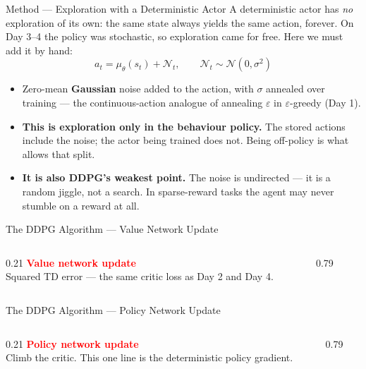 \begin{frame}{Method --- Exploration with a Deterministic Actor}
\vspace{0.4em}
A deterministic actor has \emph{no} exploration of its own: the same state always yields the same action, forever. On Day 3--4 the policy was stochastic, so exploration came for free. Here we must add it by hand:
\[
a_t = \mu_\theta(s_t) + \mathcal{N}_t, \qquad \mathcal{N}_t \sim \mathcal{N}(0, \sigma^2)
\]
\begin{itemize}
    \item Zero-mean \textbf{Gaussian} noise added to the action, with $\sigma$ annealed over training --- the continuous-action analogue of annealing $\varepsilon$ in $\varepsilon$-greedy (Day 1).
    \pause
    \item \textbf{This is exploration only in the behaviour policy.} The stored actions include the noise; the actor being trained does not. Being off-policy is what allows that split.
    \item \textbf{It is also DDPG's weakest point.} The noise is undirected --- it is a random jiggle, not a search. In sparse-reward tasks the agent may never stumble on a reward at all.
\end{itemize}
\end{frame}

\begin{frame}{The DDPG Algorithm --- Value Network Update}
\begin{columns}[T]
\begin{column}{0.21\textwidth}
\vspace{8.6em}
\footnotesize
\textbf{\textcolor{red}{Value network update}}\\[0.4em]
{\scriptsize Squared TD error --- the same critic loss as Day 2 and Day 4.}
\end{column}
\begin{column}{0.79\textwidth}
\end{column}
\end{columns}
\end{frame}

\begin{frame}{The DDPG Algorithm --- Policy Network Update}
\begin{columns}[T]
\begin{column}{0.21\textwidth}
\vspace{11.5em}
\footnotesize
\textbf{\textcolor{red}{Policy network update}}\\[0.4em]
{\scriptsize Climb the critic. This one line is the deterministic policy gradient.}
\end{column}
\begin{column}{0.79\textwidth}
\end{column}
\end{columns}
\vspace{0.2em}
\ddpgalgofoot
\end{frame}

